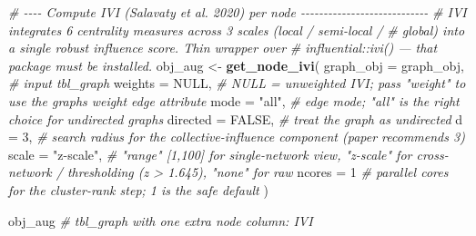 \documentclass[
]{book}
\newenvironment{Shaded}{\begin{snugshade}}{\end{snugshade}}
\newcommand{\AttributeTok}[1]{\textcolor[rgb]{0.13,0.29,0.53}{#1}}
\newcommand{\CommentTok}[1]{\textcolor[rgb]{0.56,0.35,0.01}{\textit{#1}}}
\newcommand{\ConstantTok}[1]{\textcolor[rgb]{0.56,0.35,0.01}{#1}}
\newcommand{\DecValTok}[1]{\textcolor[rgb]{0.00,0.00,0.81}{#1}}
\newcommand{\FunctionTok}[1]{\textcolor[rgb]{0.13,0.29,0.53}{\textbf{#1}}}
\newcommand{\NormalTok}[1]{#1}
\newcommand{\OtherTok}[1]{\textcolor[rgb]{0.56,0.35,0.01}{#1}}
\newcommand{\StringTok}[1]{\textcolor[rgb]{0.31,0.60,0.02}{#1}}
\begin{document}
\begin{Shaded}
\begin{Highlighting}[]
\CommentTok{\# {-}{-}{-}{-} Compute IVI (Salavaty et al. 2020) per node {-}{-}{-}{-}{-}{-}{-}{-}{-}{-}{-}{-}{-}{-}{-}{-}{-}{-}{-}{-}{-}{-}{-}{-}{-}{-}{-}{-}}
\CommentTok{\# IVI integrates 6 centrality measures across 3 scales (local / semi{-}local /}
\CommentTok{\# global) into a single robust influence score. Thin wrapper over}
\CommentTok{\# influential::ivi() — that package must be installed.}
\NormalTok{obj\_aug }\OtherTok{\textless{}{-}} \FunctionTok{get\_node\_ivi}\NormalTok{(}
  \AttributeTok{graph\_obj =}\NormalTok{ graph\_obj,   }\CommentTok{\# input tbl\_graph}
  \AttributeTok{weights   =} \ConstantTok{NULL}\NormalTok{,        }\CommentTok{\# NULL = unweighted IVI; pass "weight" to use the graph\textquotesingle{}s \textasciigrave{}weight\textasciigrave{} edge attribute}
  \AttributeTok{mode      =} \StringTok{"all"}\NormalTok{,       }\CommentTok{\# edge mode; "all" is the right choice for undirected graphs}
  \AttributeTok{directed  =} \ConstantTok{FALSE}\NormalTok{,       }\CommentTok{\# treat the graph as undirected}
  \AttributeTok{d         =} \DecValTok{3}\NormalTok{,           }\CommentTok{\# search radius for the collective{-}influence component (paper recommends 3)}
  \AttributeTok{scale     =} \StringTok{"z{-}scale"}\NormalTok{,   }\CommentTok{\# "range" [1,100] for single{-}network view, "z{-}scale" for cross{-}network / thresholding (z \textgreater{} 1.645), "none" for raw}
  \AttributeTok{ncores    =} \DecValTok{1}            \CommentTok{\# parallel cores for the cluster{-}rank step; 1 is the safe default}
\NormalTok{)}


\NormalTok{obj\_aug         }\CommentTok{\# tbl\_graph with one extra node column: IVI}
\end{Highlighting}
\end{Shaded}
\end{document}
